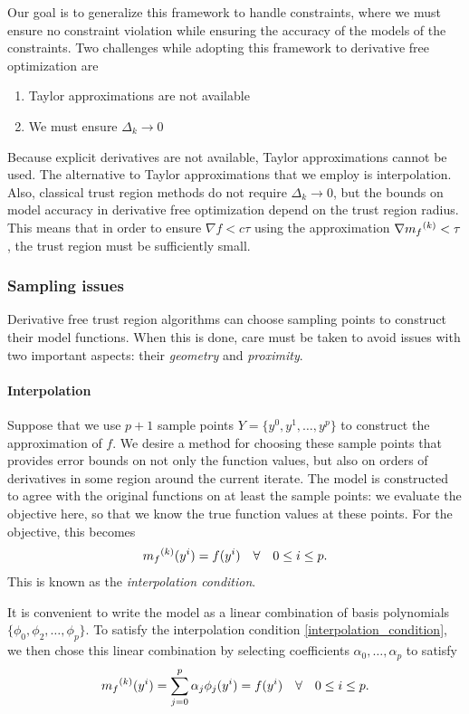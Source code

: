 Our goal is to generalize this framework to handle constraints, where we must ensure no constraint violation while ensuring the accuracy of the models of the constraints.
Two challenges while adopting this framework to derivative free optimization are
\begin{enumerate}
    \item Taylor approximations are not available
    \item We must ensure $\Delta_k \to 0$
\end{enumerate}
Because explicit derivatives are not available, Taylor approximations cannot be used.
The alternative to Taylor approximations that we employ is interpolation.
Also, classical trust region methods do not require $\Delta_k \to 0$, but the bounds on model accuracy in derivative free optimization depend on the trust region radius.
This means that in order to ensure $\nabla f < c\tau$ using the approximation  $\nabla {{m}_f}^{(k)} < \tau$, the trust region must be sufficiently small.
  
  
\subsubsection{Sampling issues}
Derivative free trust region algorithms can choose sampling points to construct their model functions.
When this is done, care must be taken to avoid issues with two important aspects: their \emph{geometry} and \emph{proximity}.

\paragraph{Interpolation}
\label{interpolation}
Suppose that we use $p+1$ sample points $Y = \{y^0, y^1, \ldots, y^p\}$ to construct the approximation of $f$.
We desire a method for choosing these sample points that provides error bounds on not only the function values, but also on orders of derivatives in some region around the current iterate.
The model is constructed to agree with the original functions on at least the sample points: we evaluate the objective here, so that we know the true function values at these points.
For the objective, this becomes
\begin{align}
\label{interpolation_condition}
{{m}_f}^{(k)}(y^i) = f(y^i) \quad \forall \quad 0 \le i \le p.
\end{align}
This is known as the \emph{interpolation condition}.

It is convenient to write the model as a linear combination of basis polynomials $\{\phi_0, \phi_2, \ldots, \phi_p\}$.
To satisfy the interpolation condition \ref{interpolation_condition}, we then chose this linear combination by selecting coefficients $\alpha_0, \ldots, \alpha_p$ to satisfy
\[
    {{m}_f}^{(k)}(y^i) = \sum^p_{j=0}\alpha_j\phi_j(y^i) = f(y^i) \quad \forall \quad 0 \le i \le p.
\]

